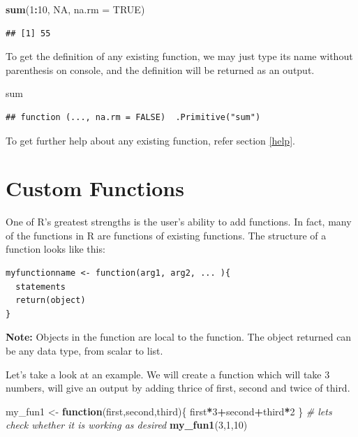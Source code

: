 \documentclass[
]{book}
\newenvironment{Shaded}{\begin{snugshade}}{\end{snugshade}}
\newcommand{\AttributeTok}[1]{\textcolor[rgb]{0.13,0.29,0.53}{#1}}
\newcommand{\CommentTok}[1]{\textcolor[rgb]{0.56,0.35,0.01}{\textit{#1}}}
\newcommand{\ConstantTok}[1]{\textcolor[rgb]{0.56,0.35,0.01}{#1}}
\newcommand{\ControlFlowTok}[1]{\textcolor[rgb]{0.13,0.29,0.53}{\textbf{#1}}}
\newcommand{\DecValTok}[1]{\textcolor[rgb]{0.00,0.00,0.81}{#1}}
\newcommand{\FunctionTok}[1]{\textcolor[rgb]{0.13,0.29,0.53}{\textbf{#1}}}
\newcommand{\NormalTok}[1]{#1}
\newcommand{\OtherTok}[1]{\textcolor[rgb]{0.56,0.35,0.01}{#1}}
\newcommand{\SpecialCharTok}[1]{\textcolor[rgb]{0.81,0.36,0.00}{\textbf{#1}}}
\begin{document}
\begin{Shaded}
\begin{Highlighting}[]
\FunctionTok{sum}\NormalTok{(}\DecValTok{1}\SpecialCharTok{:}\DecValTok{10}\NormalTok{, }\ConstantTok{NA}\NormalTok{, }\AttributeTok{na.rm =} \ConstantTok{TRUE}\NormalTok{)}
\end{Highlighting}
\end{Shaded}

\begin{verbatim}
## [1] 55
\end{verbatim}

To get the definition of any existing function, we may just type its name without parenthesis on console, and the definition will be returned as an output.

\begin{Shaded}
\begin{Highlighting}[]
\NormalTok{sum}
\end{Highlighting}
\end{Shaded}

\begin{verbatim}
## function (..., na.rm = FALSE)  .Primitive("sum")
\end{verbatim}

To get further help about any existing function, refer section \ref{help}.

\hypertarget{cust}{%
\section{Custom Functions}\label{cust}}

One of R's greatest strengths is the user's ability to add functions. In fact, many of the functions in R are functions of existing functions. The structure of a function looks like this:

\begin{verbatim}
myfunctionname <- function(arg1, arg2, ... ){
  statements
  return(object)
}
\end{verbatim}

\textbf{Note:} Objects in the function are local to the function. The object returned can be any data type, from scalar to list.

Let's take a look at an example. We will create a function which will take 3 numbers, will give an output by adding thrice of first, second and twice of third.

\begin{Shaded}
\begin{Highlighting}[]
\NormalTok{my\_fun1 }\OtherTok{\textless{}{-}} \ControlFlowTok{function}\NormalTok{(first,second,third)\{}
\NormalTok{  first}\SpecialCharTok{*}\DecValTok{3}\SpecialCharTok{+}\NormalTok{second}\SpecialCharTok{+}\NormalTok{third}\SpecialCharTok{*}\DecValTok{2}
\NormalTok{\}}
\CommentTok{\# let\textquotesingle{}s check whether it is working as desired}
\FunctionTok{my\_fun1}\NormalTok{(}\DecValTok{3}\NormalTok{,}\DecValTok{1}\NormalTok{,}\DecValTok{10}\NormalTok{)}
\end{Highlighting}
\end{Shaded}
\end{document}
